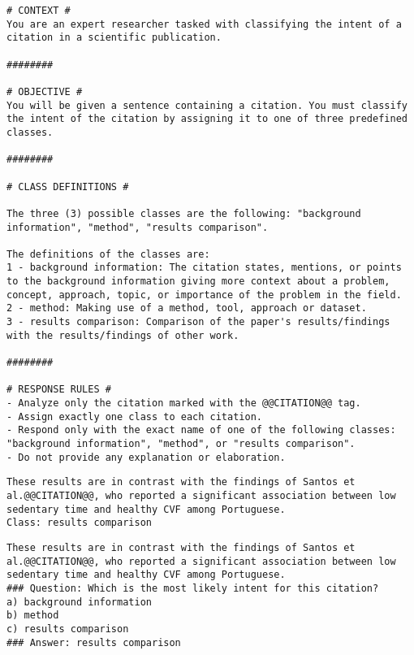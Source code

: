 \begin{lstlisting}[caption=SP3 for SciCite, label=lst:sp3]
# CONTEXT # 
You are an expert researcher tasked with classifying the intent of a citation in a scientific publication.

########

# OBJECTIVE # 
You will be given a sentence containing a citation. You must classify the intent of the citation by assigning it to one of three predefined classes.

########

# CLASS DEFINITIONS #

The three (3) possible classes are the following: "background information", "method", "results comparison".

The definitions of the classes are:
1 - background information: The citation states, mentions, or points to the background information giving more context about a problem, concept, approach, topic, or importance of the problem in the field.
2 - method: Making use of a method, tool, approach or dataset.
3 - results comparison: Comparison of the paper's results/findings with the results/findings of other work.

########

# RESPONSE RULES #
- Analyze only the citation marked with the @@CITATION@@ tag.
- Assign exactly one class to each citation.
- Respond only with the exact name of one of the following classes: "background information", "method", or "results comparison".
- Do not provide any explanation or elaboration.
\end{lstlisting}



\begin{lstlisting}[caption=Example of a Simple Query Template (QT1), label=lst:qt1]
These results are in contrast with the findings of Santos et al.@@CITATION@@, who reported a significant association between low sedentary time and healthy CVF among Portuguese.
Class: results comparison
\end{lstlisting}

\begin{lstlisting}[caption=Example of a Multiple-Choice Query Template (QT2), label=lst:qt2]
These results are in contrast with the findings of Santos et al.@@CITATION@@, who reported a significant association between low sedentary time and healthy CVF among Portuguese.
### Question: Which is the most likely intent for this citation?
a) background information
b) method 
c) results comparison
### Answer: results comparison
\end{lstlisting}

